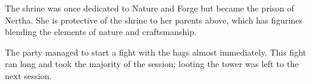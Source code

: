 The shrine was once dedicated to Nature and Forge but became the prison of Nertha.
She is protective of the shrine to her parents above, which has figurines blending the elements of nature and craftsmanship.

The party managed to start a fight with the hags almost immediately.
This fight ran long and took the majority of the session; looting the tower was left to the next session.
